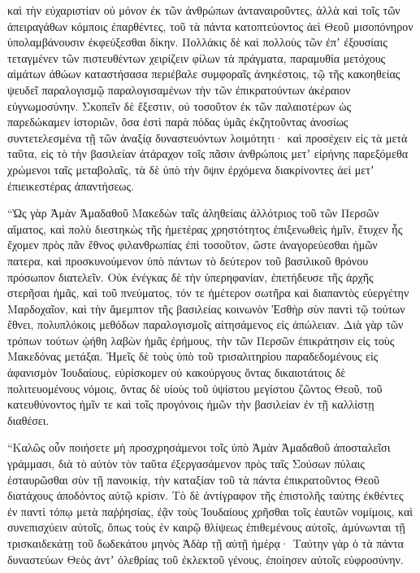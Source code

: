 {καὶ τὴν εὐχαριστίαν οὐ μόνον ἐκ τῶν ἀνθρώπων ἀνταναιροῦντες, ἀλλὰ καὶ τοῖς τῶν ἀπειραγάθων κόμποις ἐπαρθέντες, τοῦ τὰ πάντα κατοπτεύοντος ἀεὶ Θεοῦ μισοπόνηρον ὑπολαμβάνουσιν ἐκφεύξεσθαι δίκην.
Πολλάκις δὲ καὶ πολλοὺς τῶν ἐπʼ ἐξουσίαις τεταγμένεν τῶν πιστευθέντων χειρίζειν φίλων τὰ πράγματα, παραμυθία μετόχους αἱμάτων ἀθώων καταστήσασα περιέβαλε συμφοραῖς ἀνηκέστοις,
τῷ τῆς κακοηθείας ψευδεῖ παραλογισμῷ παραλογισαμένων τὴν τῶν ἐπικρατούντων ἀκέραιον εὐγνωμοσύνην.
Σκοπεῖν δὲ ἔξεστιν, οὐ τοσοῦτον ἐκ τῶν παλαιοτέρων ὡς παρεδώκαμεν ἱστοριῶν, ὅσα ἐστὶ παρὰ πόδας ὑμᾶς ἐκζητοῦντας ἀνοσίως συντετελεσμένα τῇ τῶν ἀναξίᾳ δυναστευόντων λοιμότητι·
καὶ προσέχειν εἰς τὰ μετὰ ταῦτα, εἰς τὸ τὴν βασιλείαν ἀτάραχον τοῖς πᾶσιν ἀνθρώποις μετʼ εἰρήνης παρεξόμεθα
χρώμενοι ταῖς μεταβολαῖς, τὰ δὲ ὑπὸ τὴν ὄψιν ἐρχόμενα διακρίνοντες ἀεὶ μετʼ ἐπιεικεστέρας ἀπαντήσεως.
\par }{\PP {}“Ὡς γὰρ Ἀμὰν Ἀμαδαθοῦ Μακεδὼν ταῖς ἀληθείαις ἀλλότριος τοῦ τῶν Περσῶν αἵματος, καὶ πολὺ διεστηκὼς τῆς ἡμετέρας χρηστότητος ἐπιξενωθεὶς ἡμῖν,
ἔτυχεν ἧς ἔχομεν πρὸς πᾶν ἔθνος φιλανθρωπίας ἐπὶ τοσοῦτον, ὥστε ἀναγορεύεσθαι ἡμῶν πατερα, καὶ προσκυνούμενον ὑπὸ πάντων τὸ δεύτερον τοῦ βασιλικοῦ θρόνου πρόσωπον διατελεῖν.
Οὐκ ἐνέγκας δὲ τὴν ὑπερηφανίαν, ἐπετήδευσε τῆς ἀρχῆς στερῆσαι ἡμᾶς, καὶ τοῦ πνεύματος,
τόν τε ἡμέτερον σωτῆρα καὶ διαπαντὸς εὐεργέτην Μαρδοχαῖον, καὶ τὴν ἄμεμπτον τῆς βασιλείας κοινωνὸν Ἐσθὴρ σὺν παντὶ τῷ τούτων ἔθνει, πολυπλόκοις μεθόδων παραλογισμοῖς αἰτησάμενος εἰς ἀπώλειαν.
Διὰ γὰρ τῶν τρόπων τούτων ᾠήθη λαβὼν ἡμᾶς ἐρήμους, τὴν τῶν Περσῶν ἐπικράτησιν εἰς τοὺς Μακεδόνας μετάξαι.
Ἡμεῖς δὲ τοὺς ὑπὸ τοῦ τρισαλιτηρίου παραδεδομένους εἰς ἀφανισμὸν Ἰουδαίους, εὑρίσκομεν οὐ κακούργους ὄντας δικαιοτάτοις δὲ πολιτευομένους νόμοις,
ὄντας δὲ υἱοὺς τοῦ ὑψίστου μεγίστου ζῶντος Θεοῦ, τοῦ κατευθύνοντος ἡμῖν τε καὶ τοῖς προγόνοις ἡμῶν τὴν βασιλείαν ἐν τῇ καλλίστῃ διαθέσει.
\par }{\PP {}“Καλῶς οὖν ποιήσετε μὴ προσχρησάμενοι τοῖς ὑπὸ Ἀμὰν Ἀμαδαθοῦ ἀποσταλεῖσι γράμμασι, διὰ τὸ αὐτὸν τὸν ταῦτα ἐξεργασάμενον πρὸς ταῖς Σούσων πύλαις ἐσταυρῶσθαι σὺν τῇ πανοικίᾳ, τὴν καταξίαν τοῦ τὰ πάντα ἐπικρατοῦντος Θεοῦ διατάχους ἀποδόντος αὐτῷ κρίσιν.
Τὸ δὲ ἀντίγραφον τῆς ἐπιστολῆς ταύτης ἐκθέντες ἐν παντὶ τόπῳ μετὰ παῤῥησίας, ἐᾷν τοὺς Ἰουδαίους χρῆσθαι τοῖς ἑαυτῶν νομίμοις, καὶ συνεπισχύειν αὐτοῖς, ὅπως τοὺς ἐν καιρῷ θλίψεως ἐπιθεμένους αὐτοῖς, ἀμύνωνται τῇ τρισκαιδεκάτῃ τοῦ δωδεκάτου μηνὸς Ἀδὰρ τῇ αὐτῇ ἡμέρᾳ·
Ταύτην γὰρ ὁ τὰ πάντα δυναστεύων Θεὸς ἀντʼ ὀλεθρίας τοῦ ἐκλεκτοῦ γένους, ἐποίησεν αὐτοῖς εὐφροσύνην.
}
